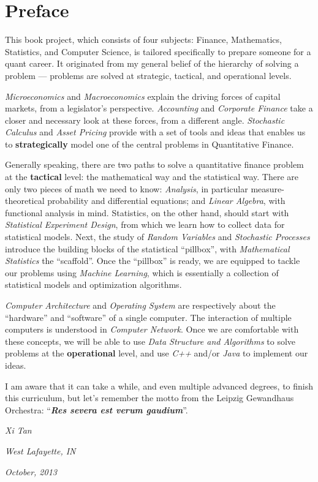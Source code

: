 \chapter*{Preface}
This book project, which consists of four subjects: Finance, Mathematics, Statistics, and Computer Science, is tailored specifically to prepare someone for a quant career. It originated from my general belief of the hierarchy of solving a problem --- problems are solved at strategic, tactical, and operational levels.

{\em{Microeconomics}} and {\em{Macroeconomics}} explain the driving forces of capital markets, from a legislator's perspective. {\em{Accounting}} and {\em{Corporate Finance}} take a closer and necessary look at these forces, from a different angle. {\em{Stochastic Calculus}} and {\em{Asset Pricing}} provide with a set of tools and ideas that enables us to {\bf{strategically}} model one of the central problems in Quantitative Finance.

Generally speaking, there are two paths to solve a quantitative finance problem at the {\bf{tactical}} level: the mathematical way and the statistical way. There are only two pieces of math we need to know: {\em{Analysis}}, in particular measure-theoretical probability and differential equations; and {\em{Linear Algebra}}, with functional analysis in mind. Statistics, on the other hand, should start with {\em{Statistical Experiment Design}}, from which we learn how to collect data for statistical models. Next, the study of {\em{Random Variables}} and {\em{Stochastic Processes}} introduce the building blocks of the statistical ``pillbox'', with {\em{Mathematical Statistics}} the ``scaffold''. Once the ``pillbox'' is ready, we are equipped to tackle our problems using {\em{Machine Learning}}, which is essentially a collection of statistical models and optimization algorithms.

{\em{Computer Architecture}} and {\em{Operating System}} are respectively about the ``hardware'' and ``software'' of a single computer. The interaction of multiple computers is understood in {\em{Computer Network}}. Once we are comfortable with these concepts, we will be able to use {\em{Data Structure and Algorithms}} to solve problems at the {\bf{operational}} level, and use {\em{C++}} and/or {\em{Java}} to implement our ideas.

I am aware that it can take a while, and even multiple advanced degrees, to finish this curriculum, but let's remember the motto from the Leipzig Gewandhaus Orchestra: ``{\bf{\em{Res severa est verum gaudium}}}''.

\vspace{8mm}
\hfill {\em{Xi Tan}}

\hfill {\em{West Lafayette, IN}}

\hfill {\em{October, 2013}}
